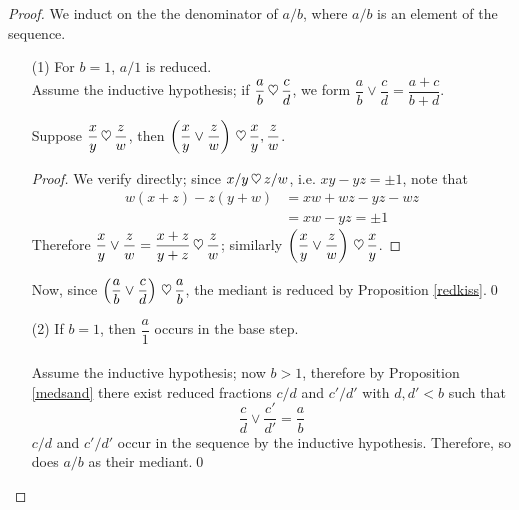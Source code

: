 \begin{proof}
We induct on the the denominator of $a/b$, where $a/b$ is an element of the sequence.
\begin{itemize}
\item[(1)] For $b = 1$, $a/1$ is reduced.\\[0.5em]
Assume the inductive hypothesis; if $\dfrac{a}{b}\,\heartsuit\, \dfrac{c}{d}$, we form $\dfrac{a}{b}\vee \dfrac{c}{d} = \dfrac{a+c}{b+d}$.
\vspace*{0.2in}
\begin{subproof}
\vspace*{-0.1in}
\begin{lemma}\label{medkiss}
Suppose $\dfrac{x}{y} \,\heartsuit\, \dfrac{z}{w}$, then $\left(\dfrac{x}{y}\vee \dfrac{z}{w}\right)\,\heartsuit\, \dfrac{x}{y},\dfrac{z}{w}$.
\end{lemma}
\begin{proof}
We verify directly; since $x/y \,\heartsuit\, z/w$, i.e. $xy - yz = \pm 1$, note that
\begin{align*}
w(x+z) - z(y+w) &= xw + wz - yz - wz\\[0.5em]
&= xw - yz = \pm 1
\end{align*}
Therefore $\dfrac{x}{y}\vee \dfrac{z}{w} = \dfrac{x+z}{y+z} \,\heartsuit\, \dfrac{z}{w}$; similarly $\left(\dfrac{x}{y}\vee \dfrac{z}{w}\right) \,\heartsuit\, \dfrac{x}{y}$.
\end{proof}
\end{subproof}
Now, since $\left(\dfrac{a}{b}\vee \dfrac{c}{d}\right) \,\heartsuit\, \dfrac{a}{b}$, the mediant is reduced by Proposition \ref{redkiss}.\qed

\item[(2)] If $b = 1$, then $\dfrac{a}{1}$ occurs in the base step.\\
\\
Assume the inductive hypothesis; now $b > 1$, therefore by Proposition \ref{medsand} there exist reduced fractions $c/d$ and $c'/d'$ with $d,d' < b$ such that 
\[\dfrac{c}{d} \vee \dfrac{c'}{d'} = \dfrac{a}{b}\]
$c/d$ and $c'/d'$ occur in the sequence by the inductive hypothesis. Therefore, so does $a/b$ as their mediant.\qed
\end{itemize}\renewcommand{\qedsymbol}{}
\vspace*{-\baselineskip}
\end{proof}

\vspace*{1em}

